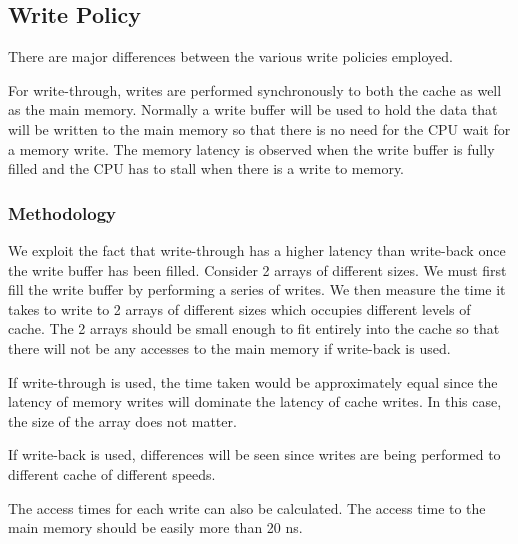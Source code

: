 \documentclass{article}
\begin{document}
\subsection{Write Policy}

There are major differences between the various write policies employed. 

For write-through, writes are performed synchronously to both the cache as well as the main memory. Normally a write buffer will be used to hold the data that will be written to the main memory so that there is no need for the CPU wait for a memory write. The memory latency is observed when the write buffer is fully filled and the CPU has to stall when there is a write to memory. 


\subsubsection{Methodology}

We exploit the fact that write-through has a higher latency than write-back once the write buffer has been filled. Consider 2 arrays of different sizes. We must first fill the write buffer by performing a series of writes. We then measure the time it takes to write to 2 arrays of different sizes which occupies different levels of cache. The 2 arrays should be small enough to fit entirely into the cache so that there will not be any accesses to the main memory if write-back is used.

If write-through is used, the time taken would be approximately equal since the latency of memory writes will dominate the latency of cache writes. In this case, the size of the array does not matter.

If write-back is used, differences will be seen since writes are being performed to different cache of different speeds.

The access times for each write can also be calculated. The access time to the main memory should be easily more than 20 ns.  
\end{document}
